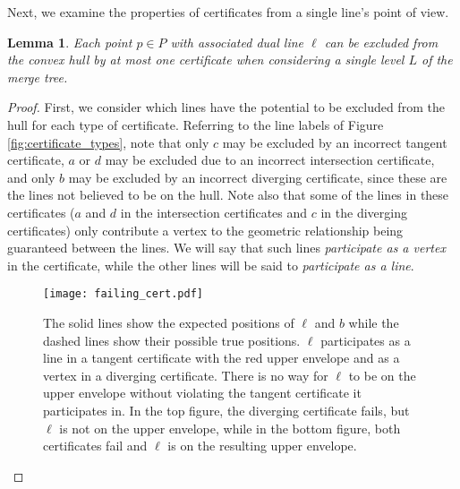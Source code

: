 \documentclass[11pt]{article}
\newtheorem{lemma}{\textbf{Lemma}}[section]
\begin{document}
Next, we examine the properties of certificates from a single line's point of view.

\begin{lemma}
\label{lem:one_cert}
Each point $p \in P$ with associated dual line $\ell$ can be excluded from the convex hull by at most one certificate when considering a single level $L$ of the merge tree.
\end{lemma}

\begin{proof} 
First, we consider which lines have the potential to be excluded from the hull for each type of certificate.  Referring to the line labels of Figure \ref{fig:certificate_types}, note that only $c$ may be excluded by an incorrect tangent certificate, $a$ or $d$ may be excluded due to an incorrect intersection certificate, and only $b$ may be excluded by an incorrect diverging certificate, since these are the lines not believed to be on the hull.  Note also that some of the lines in these certificates ($a$ and $d$ in the intersection certificates and $c$ in the diverging certificates) only contribute a vertex to the geometric relationship being guaranteed between the lines.  We will say that such lines \emph{participate as a vertex} in the certificate, while the other lines will be said to \emph{participate as a line}.

\begin{figure}[htbp]
   \centering
   \texttt{[image: failing\_cert.pdf]} \caption{The solid lines show the expected positions of $\ell$ and $b$ while the dashed lines show their possible true positions.  $\ell$ participates as a line in a tangent certificate with the red upper envelope and as a vertex in a diverging certificate.  There is no way for $\ell$ to be on the upper envelope without violating the tangent certificate it participates in.  In the top figure, the diverging certificate fails, but $\ell$ is not on the upper envelope, while in the bottom figure, both certificates fail and $\ell$ is on the resulting upper envelope.}
   \label{fig:failing_cert}
\end{figure}


\end{proof}
\end{document}
